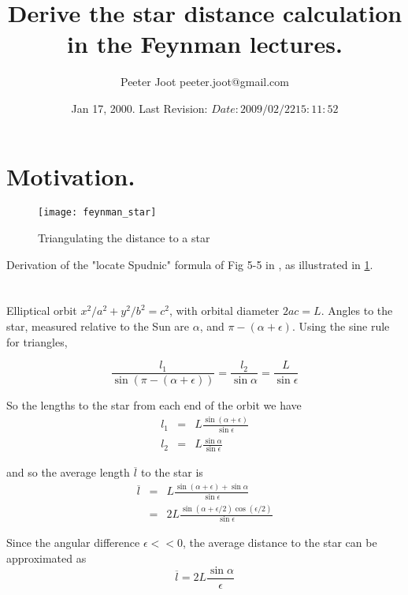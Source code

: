\documentclass{article}
\title{ Derive the star distance calculation in the Feynman lectures. }
\author{Peeter Joot \quad peeter.joot@gmail.com}
\date{ Jan 17, 2000.  Last Revision: $Date: 2009/02/22 15:11:52 $ }
\begin{document}
\maketitle{}

\section{ Motivation. }

\begin{figure}[htp]
\centering
\texttt{[image: feynman\_star]}
\caption{Triangulating the distance to a star}\label{fig:feynman_star}
\end{figure}

Derivation of the "locate Spudnic" formula of Fig 5-5 in 
\cite{feynman1963flp}, as illustrated in \ref{fig:feynman_star}.

\section{}

Elliptical orbit $x^2/a^2 + y^2/b^2 = c^2$, with orbital diameter $2ac = L$.
Angles to the star, measured relative to the Sun are $\alpha$, and 
$\pi - (\alpha+\epsilon)$.  Using the sine rule for triangles, 

\begin{displaymath}
  \frac{ l_1}{\sin(\pi - (\alpha + \epsilon))} 
= \frac{ l_2 }{\sin{\alpha}}
= \frac{L}{\sin{\epsilon}}
\end{displaymath}

So the lengths to the star from each end of the orbit we have 
\begin{eqnarray*}
l_1 & = & L \frac{ \sin(\alpha + \epsilon) }   { \sin{\epsilon}} \\
l_2 & = & L \frac{ \sin{\alpha} }   { \sin{\epsilon}}
\end{eqnarray*}

and so the average length $\overline{l}$ to the star is 
\begin{eqnarray*}
\overline{l} & = & L \frac{ \sin(\alpha + \epsilon) + \sin{\alpha} }{    \sin{\epsilon}} \\
             & = & 2L \frac{ \sin(\alpha + \epsilon/2)\cos(\epsilon/2) }{    \sin{\epsilon}}
\end{eqnarray*}

Since the angular difference $\epsilon << 0$, the average distance to the star can be approximated as
\begin{displaymath}
\overline{l} = 2L \frac{ \sin{\alpha} }{\epsilon }
\end{displaymath}




\end{document}
